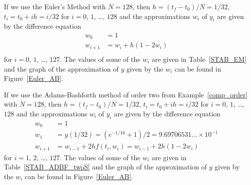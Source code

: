 \begin{egg}
If we use the Euler's Method with $N=128$, then $h=(t_f-t_0)/N = 1/32$,
$t_i = t_0 + ih = i/32$ for $i=0$, $1$, \ldots, $128$ and the
approximations $w_i$ of $y_i$ are given by the difference equation
\begin{align*}
w_0 &= 1 \\
w_{i+1} &= w_i + h(1-2w_i) \\
\end{align*}
for $i=0$, $1$, \ldots, $127$.  The values of some of the $w_i$
are given in Table~\ref{STAB_EM} and the graph of the
approximation of $y$ given by the $w_i$ can be found in
Figure~\ref{Euler_AB}.

If we use the Adams-Bashforth method of order two from
Example~\ref{comp_order} with $N=128$, then $h=(t_f-t_0)/N = 1/32$,
$t_i = t_0 + ih = i/32$ for $i=0$, $1$, \ldots, $128$ and the
approximations $w_i$ of $y_i$ are given by the difference equation
\begin{align*}
w_0 &= 1 \\
w_1 &= y(1/32) = (e^{-1/16}+1)/2 = 9.69706531\ldots \times 10^{-1} \\
w_{i+1} &= w_{i-1} + 2hf(t_i,w_i) = w_{i-1} + 2h(1-2w_i)
\end{align*}
for $i=1$, $2$, \ldots, $127$.  The values of some of the $w_i$
are given in Table~\ref{STAB_ADBF_twoS} and the graph of the
approximation of $y$ given by the $w_i$ can be found in
Figure~\ref{Euler_AB}.


\end{egg}
